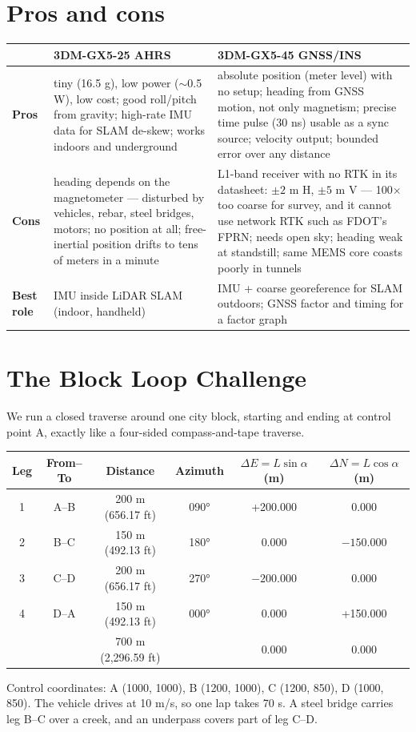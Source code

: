 \section{Pros and cons}
\begin{center}\small
\renewcommand{\arraystretch}{1.25}
\begin{tabularx}{\linewidth}{>{\bfseries}p{2.3cm}XX}\toprule
 & 3DM-GX5-25 AHRS & 3DM-GX5-45 GNSS/INS\\\midrule
Pros & tiny (16.5 g), low power ($\sim$0.5 W), low cost; good roll/pitch from gravity; high-rate IMU data for SLAM de-skew; works indoors and underground & absolute position (meter level) with no setup; heading from GNSS motion, not only magnetism; precise time pulse (30 ns) usable as a sync source; velocity output; bounded error over any distance\\
Cons & heading depends on the magnetometer --- disturbed by vehicles, rebar, steel bridges, motors; no position at all; free-inertial position drifts to tens of meters in a minute & L1-band receiver with no RTK in its datasheet: $\pm2$ m H, $\pm5$ m V --- 100$\times$ too coarse for survey, and it cannot use network RTK such as FDOT's FPRN; needs open sky; heading weak at standstill; same MEMS core coasts poorly in tunnels\\
Best role & IMU inside LiDAR SLAM (indoor, handheld) & IMU + coarse georeference for SLAM outdoors; GNSS factor and timing for a factor graph\\\bottomrule
\end{tabularx}\end{center}

\section{The Block Loop Challenge}
We run a closed traverse around one city block, starting and ending at control point A, exactly like a four-sided compass-and-tape traverse.

\begin{center}\small
\begin{tabular}{cccccc}\toprule
Leg & From--To & Distance & Azimuth & $\Delta E=L\sin\alpha$ (m) & $\Delta N=L\cos\alpha$ (m)\\\midrule
1 & A--B & 200 m (656.17 ft) & 090° & +200.000 & 0.000\\
2 & B--C & 150 m (492.13 ft) & 180° & 0.000 & $-150.000$\\
3 & C--D & 200 m (656.17 ft) & 270° & $-200.000$ & 0.000\\
4 & D--A & 150 m (492.13 ft) & 000° & 0.000 & +150.000\\\midrule
 & & 700 m (2,296.59 ft) & & 0.000 & 0.000\\\bottomrule
\end{tabular}\end{center}
Control coordinates: A (1000, 1000), B (1200, 1000), C (1200, 850), D (1000, 850). The vehicle drives at 10 m/s, so one lap takes 70 s. A steel bridge carries leg B--C over a creek, and an underpass covers part of leg C--D.

